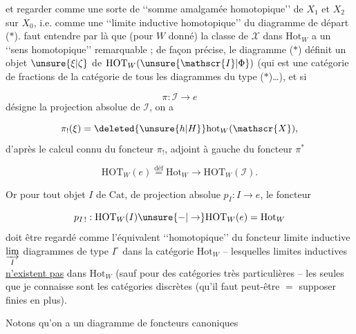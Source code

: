 et  regarder comme une sorte de \lq\lq somme amalgamée homotopique\rq\rq{} de $X_1$ et $X_2$ sur $X_0$, i.e. comme une \lq\lq limite inductive homotopique\rq\rq{} du diagramme de départ ($*$).
 faut entendre par là que (pour $W$  donné) la classe  de $\mathscr{X}$ dans $\mathrm{Hot}_W$ a un \lq\lq sens homotopique\rq\rq{} remarquable  ; de façon précise, le diagramme ($*$) définit un objet $\unsure{\xi|\zeta}$ de $\mathrm{HOT}_W(\unsure{\mathscr{I}|\Phi})$ (qui est une catégorie de fractions de la catégorie de tous les diagrammes du type ($*$)\ldots), et si \deleted{\unsure{$\xi$}}

\[
\pi:\mathscr{I}\longrightarrow e
\]
désigne la projection absolue de $\mathscr{I}$, on a

\[
\pi_!(\xi)=\deleted{\unsure{h|H}}\mathrm{hot}_W(\mathscr{X}),
\]
d'après le calcul connu du foncteur $\pi_!$, adjoint à gauche du foncteur $\pi^*$

\[
\mathrm{HOT}_W(e)\overset{\text{déf}}{=}\mathrm{Hot}_W\longrightarrow\mathrm{HOT}_W(\mathscr{I}).
\]


Or pour tout objet $I$ de $\mathrm{Cat}$, de projection absolue $p_I:I\to e$, le foncteur

\[
p_{I\,!}:\mathrm{HOT}_W(I)\unsure{-|\to}\mathrm{HOT}_W(e)=\mathrm{Hot}_W
\]
doit être regardé comme l'équivalent \lq\lq homotopique\rq\rq{} \unsure{,} du foncteur limite inductive $\underset{I}{\varinjlim}$  diagrammes de type $I^\circ$ dans la catégorie $\mathrm{Hot}_W$ -- lesquelles limites inductives \uline{n'existent pas} dans $\mathrm{Hot}_W$ (sauf
pour des catégories très particulières -- les seules que je connaisse sont les catégories discrètes (qu'il faut peut-être $=$ supposer finies en plus).

Notons qu'on a un diagramme de foncteurs canoniques

